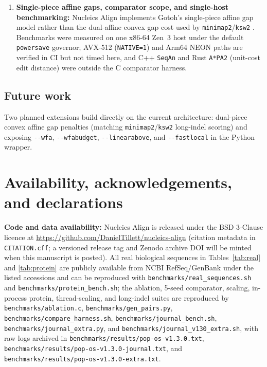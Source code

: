 \documentclass[11pt,a4paper]{article}
\begin{document}
\begin{enumerate}
  \item \textbf{Single-piece affine gaps, comparator scope, and single-host benchmarking:} Nucleics Align implements Gotoh's single-piece affine gap model rather than the dual-affine convex gap cost used by \texttt{minimap2}/\texttt{ksw2} \citep{li2018minimap2}. Benchmarks were measured on one x86-64 Zen~3 host under the default \texttt{powersave} governor; AVX-512 (\texttt{NATIVE=1}) and Arm64 NEON paths are verified in CI but not timed here, and C++ \texttt{SeqAn} and Rust \texttt{A*PA2} (unit-cost edit distance) were outside the C comparator harness.
\end{enumerate}

\subsection{Future work}

Two planned extensions build directly on the current architecture: dual-piece convex affine gap penalties (matching \texttt{minimap2}/\texttt{ksw2} long-indel scoring) and exposing \texttt{-{}-wfa}, \texttt{-{}-wfabudget}, \texttt{-{}-linearabove}, and \texttt{-{}-fastlocal} in the Python wrapper.

\section*{Availability, acknowledgements, and declarations}

\noindent\textbf{Code and data availability:} Nucleics Align is released under the BSD 3-Clause licence at \url{https://github.com/DanielTillett/nucleics-align} (citation metadata in \texttt{CITATION.cff}; a versioned release tag and Zenodo archive DOI will be minted when this manuscript is posted). All real biological sequences in Tables~\ref{tab:real} and \ref{tab:protein} are publicly available from NCBI RefSeq/GenBank under the listed accessions and can be reproduced with \texttt{benchmarks/real\_sequences.sh} and \texttt{benchmarks/protein\_bench.sh}; the ablation, 5-seed comparator, scaling, in-process protein, thread-scaling, and long-indel suites are reproduced by \texttt{benchmarks/ablation.c}, \texttt{benchmarks/gen\_pairs.py}, \texttt{benchmarks/compare\_harness.sh}, \texttt{benchmarks/journal\_bench.sh}, \texttt{benchmarks/journal\_extra.py}, and \texttt{benchmarks/journal\_v130\_extra.sh}, with raw logs archived in \texttt{benchmarks/results/pop-os-v1.3.0.txt}, \texttt{benchmarks/results/pop-os-v1.3.0-journal.txt}, and \texttt{benchmarks/results/pop-os-v1.3.0-extra.txt}.
\end{document}
